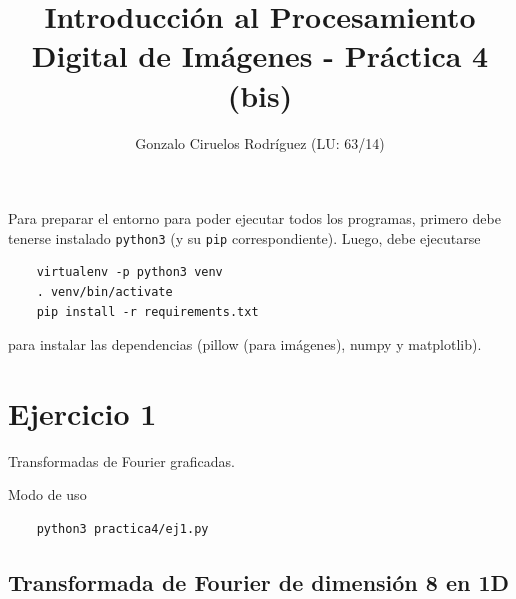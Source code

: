 \documentclass[11pt, spanish]{article}
\title{Introducción al Procesamiento Digital de Imágenes - Práctica 4 (bis)}
\date{}
\author{Gonzalo Ciruelos Rodríguez (LU: 63/14)}
\begin{document}
\maketitle

Para preparar el entorno para poder ejecutar todos los programas,
primero debe tenerse instalado \texttt{python3} (y su \texttt{pip} correspondiente).
Luego, debe ejecutarse 
\begin{verbatim}
    virtualenv -p python3 venv 
    . venv/bin/activate
    pip install -r requirements.txt 
\end{verbatim}

\noindent para instalar las dependencias (pillow (para imágenes), numpy y matplotlib).



\section{Ejercicio 1}

Transformadas de Fourier graficadas.

Modo de uso
\begin{verbatim}
    python3 practica4/ej1.py
\end{verbatim}

\subsection{Transformada de Fourier de dimensión 8 en 1D}
\end{document}
